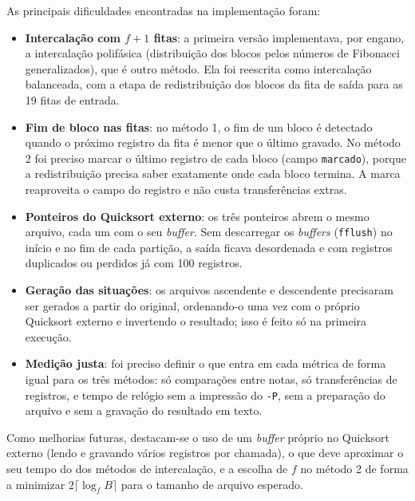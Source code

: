 \documentclass{article}
\begin{document}
As principais dificuldades encontradas na implementação foram:

\begin{itemize}
    \item \textbf{Intercalação com $f+1$ fitas}: a primeira versão implementava, por engano, a intercalação polifásica (distribuição dos blocos pelos números de Fibonacci generalizados), que é outro método. Ela foi reescrita como intercalação balanceada, com a etapa de redistribuição dos blocos da fita de saída para as 19 fitas de entrada.
    \item \textbf{Fim de bloco nas fitas}: no método 1, o fim de um bloco é detectado quando o próximo registro da fita é menor que o último gravado. No método 2 foi preciso marcar o último registro de cada bloco (campo \texttt{marcado}), porque a redistribuição precisa saber exatamente onde cada bloco termina. A marca reaproveita o campo do registro e não custa transferências extras.
    \item \textbf{Ponteiros do Quicksort externo}: os três ponteiros abrem o mesmo arquivo, cada um com o seu \emph{buffer}. Sem descarregar os \emph{buffers} (\texttt{fflush}) no início e no fim de cada partição, a saída ficava desordenada e com registros duplicados ou perdidos já com 100 registros.
    \item \textbf{Geração das situações}: os arquivos ascendente e descendente precisaram ser gerados a partir do original, ordenando-o uma vez com o próprio Quicksort externo e invertendo o resultado; isso é feito só na primeira execução.
    \item \textbf{Medição justa}: foi preciso definir o que entra em cada métrica de forma igual para os três métodos: só comparações entre notas, só transferências de registros, e tempo de relógio sem a impressão do \texttt{-P}, sem a preparação do arquivo e sem a gravação do resultado em texto.
\end{itemize}

Como melhorias futuras, destacam-se o uso de um \emph{buffer} próprio no Quicksort externo (lendo e gravando vários registros por chamada), o que deve aproximar o seu tempo do dos métodos de intercalação, e a escolha de $f$ no método 2 de forma a minimizar $2\lceil \log_{f} B \rceil$ para o tamanho de arquivo esperado.


\clearpage


\end{document}
